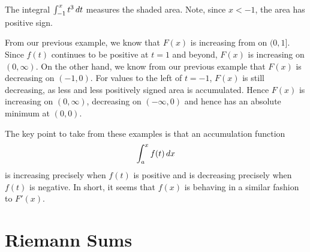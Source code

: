 \begin{marginfigure}
\caption{The integral $\int_{-1}^x t^3 \, d t$ measures the shaded
  area. Note, since $x<-1$, the area has positive sign.}
\label{figure:accumulationegreal}
\end{marginfigure}

\begin{solution}
From our previous example, we know that $F(x)$ is increasing from on
$(0,1]$. Since $f(t)$ continues to be positive at $t=1$ and beyond,
  $F(x)$ is increasing on $(0,\infty)$. On the other hand, we know
  from our previous example that $F(x)$ is decreasing on $(-1,0)$. For
  values to the left of $t=-1$, $F(x)$ is still decreasing, as less
  and less positively signed area is accumulated. Hence $F(x)$ is
  increasing on $(0,\infty)$, decreasing on $(-\infty,0)$ and hence
  has an absolute minimum at $(0,0)$.
\end{solution}

The key point to take from these examples is that an accumulation function
\[
\int_a^x f(t) \, d x 
\]
is increasing precisely when $f(t)$ is positive and is decreasing
precisely when $f(t)$ is negative. In short, it seems that $f(x)$ is
behaving in a similar fashion to $F'(x)$.




\begin{exercises}

\end{exercises}




\section{Riemann Sums}

